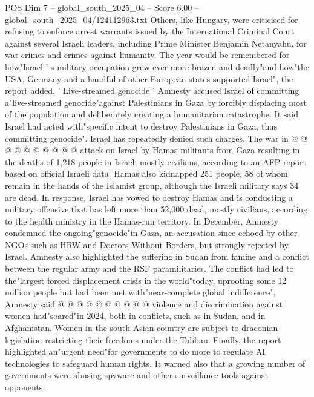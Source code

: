\begin{textsample}{POS Dim 7 – global\_south\_2025\_04 – Score 6.00 – global\_south\_2025\_04/124112963.txt}
Others, like Hungary, were criticised for refusing to enforce arrest warrants issued by the International Criminal Court against several Israeli leaders, including Prime Minister Benjamin Netanyahu, for war crimes and crimes against humanity.
The year would be remembered for how"Israel ' s military occupation grew ever more brazen and deadly"and how"the USA, Germany and a handful of other European states supported Israel", the report added. ' Live-streamed genocide ' Amnesty accused Israel of committing a"live-streamed genocide"against Palestinians in Gaza by forcibly displacing most of the population and deliberately creating a humanitarian catastrophe.
It said Israel had acted with"specific intent to destroy Palestinians in Gaza, thus committing genocide".
Israel has repeatedly denied such charges.
The war in @ @ @ @ @ @ @ @ @ @ attack on Israel by Hamas militants from Gaza resulting in the deaths of 1,218 people in Israel, mostly civilians, according to an AFP report based on official Israeli data.
Hamas also kidnapped 251 people, 58 of whom remain in the hands of the Islamist group, although the Israeli military says 34 are dead.
In response, Israel has vowed to destroy Hamas and is conducting a military offensive that has left more than 52,000 dead, mostly civilians, according to the health ministry in the Hamas-run territory.
In December, Amnesty condemned the ongoing"genocide"in Gaza, an accusation since echoed by other NGOs such as HRW and Doctors Without Borders, but strongly rejected by Israel.
Amnesty also highlighted the suffering in Sudan from famine and a conflict between the regular army and the RSF paramilitaries.
The conflict had led to the"largest forced displacement crisis in the world"today, uprooting some 12 million people but had been met with"near-complete global indifference", Amnesty said @ @ @ @ @ @ @ @ @ @ violence and discrimination against women had"soared"in 2024, both in conflicts, such as in Sudan, and in Afghanistan.
Women in the south Asian country are subject to draconian legislation restricting their freedoms under the Taliban.
Finally, the report highlighted an"urgent need"for governments to do more to regulate AI technologies to safeguard human rights.
It warned also that a growing number of governments were abusing spyware and other surveillance tools against opponents.

\end{textsample}

